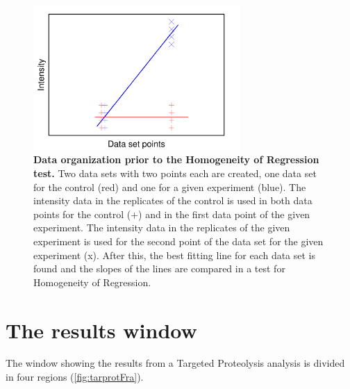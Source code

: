 \begin{figure}[h]
    \centering
    \includegraphics[width=0.7\textwidth]{./IMAGES/MOD-TARPROT/tarprot-ancova.png}	    
    \caption[Data organization prior to the Homogeneity of Regression test]{\textbf{Data
    organization prior to the Homogeneity of Regression test.} Two data sets with
    two points each are created, one data set for the control (red) and one for a
    given experiment (blue). The intensity data in the replicates of the control is
    used in both data points for the control (+) and in the first data point of the
    given experiment. The intensity data in the replicates of the given experiment
    is used for the second point of the data set for the given experiment (x). After
    this, the best fitting line for each data set is found and the slopes of the
    lines are compared in a test for Homogeneity of Regression.} 
    \label{fig:tarprotAncova}
    \vspace{-5pt} 	
\end{figure} 

\section{The results window}

The window showing the results from a Targeted Proteolysis analysis is divided in
four regions (\autoref{fig:tarprotFra}).

